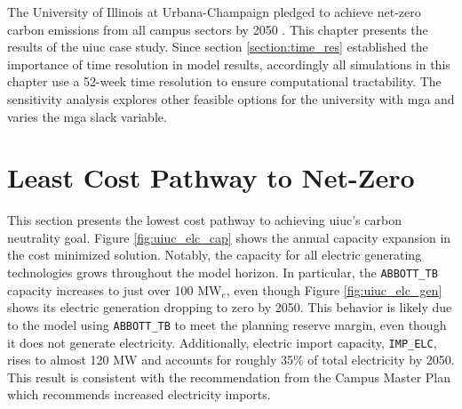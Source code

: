 The University of Illinois at Urbana-Champaign pledged to achieve net-zero carbon
emissions from all campus sectors by 2050
\cite{institute_for_sustainability_energy_and_environment_illinois_2015}. This
chapter presents the results of the \gls{uiuc} case study. Since section
\ref{section:time_res} established the importance of time resolution in model results,
accordingly all simulations in this chapter use a 52-week time resolution to ensure
computational tractability. The sensitivity analysis explores other feasible options
for the university with \gls{mga} and varies the \gls{mga} slack variable.

\section{Least Cost Pathway to Net-Zero}
This section presents the lowest cost pathway to achieving \gls{uiuc}'s carbon
neutrality goal.
Figure \ref{fig:uiuc_elc_cap} shows the annual capacity expansion in the cost
minimized solution. Notably, the capacity for all electric generating technologies
grows throughout the model horizon. In particular, the \texttt{ABBOTT\_TB} capacity
increases to just over 100 MW$_e$, even though Figure \ref{fig:uiuc_elc_gen}
shows its electric generation dropping to zero by 2050. This behavior is likely due to
the model using \texttt{ABBOTT\_TB} to meet the planning reserve margin, even
though it does not generate electricity. Additionally, electric import capacity,
\texttt{IMP\_ELC}, rises
to almost 120 MW and accounts for roughly 35\% of total electricity by 2050.
This result is consistent with the recommendation from the Campus Master Plan
\cite{affiliated_engineers_inc_utilities_2015} which recommends increased
electricity imports.


